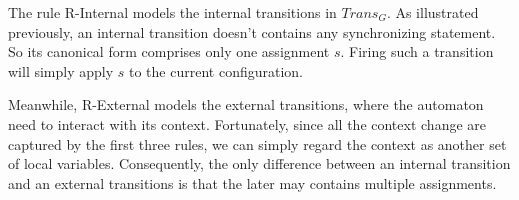 The rule R-Internal models the internal transitions in $Trans_G$. As illustrated previously, an internal transition doesn't contains any synchronizing statement. So its canonical form comprises only one assignment $s$. Firing such a transition will simply apply $s$ to the current configuration.

Meanwhile, R-External models the external transitions, where the automaton need to interact with its context. Fortunately, since all the context change are captured by the first three rules, we can simply regard the context as another set of local variables. Consequently, the only difference between an internal transition and an external transitions is that the later may contains multiple assignments.